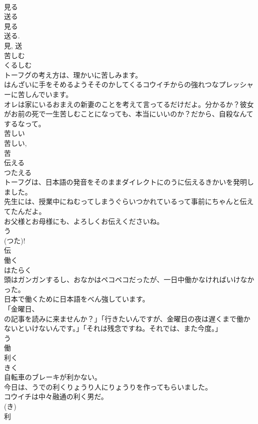 \documentclass[8pt]{extreport}
\begin{document}
\begin{CJK}{UTF8}{min}
\\	見る 
\\	送る 
\\	見る 
\\	送る. 
\\	見, 送	
\\	苦しむ	
\\	くるしむ	
\\	トーフグの考え方は、理かいに苦しみます。	
\\	はんざいに手をそめるようそそのかしてくるコウイチからの強れつなプレッシャーに苦しんでいます。	
\\	オレは家にいるおまえの新妻のことを考えて言ってるだけだよ。分かるか？彼女がお前の死で一生苦しむことになっても、本当にいいのか？だから、自殺なんてするなって。	
\\	苦しい 
\\	苦しい, 
\\	苦	
\\	伝える	
\\	つたえる	
\\	トーフグは、日本語の発音をそのままダイレクトにのうに伝えるきかいを発明しました。	
\\	先生には、授業中にねむってしまうぐらいつかれているって事前にちゃんと伝えてたんだよ。	
\\	お父様とお母様にも、よろしくお伝えくださいね。	
\\	う 
\\	(つた)! 
\\	伝	
\\	働く	
\\	はたらく	
\\	頭はガンガンするし、おなかはペコペコだったが、一日中働かなければいけなかった。	
\\	日本で働くために日本語をべん強しています。	
\\	「金曜日、
\\	の記事を読みに来ませんか？」「行きたいんですが、金曜日の夜は遅くまで働かないといけないんです。」「それは残念ですね。それでは、また今度。」	
\\	う 
\\	働	
\\	利く	
\\	きく	
\\	自転車のブレーキが利かない。	
\\	今日は、うでの利くりょうり人にりょうりを作ってもらいました。	
\\	コウイチは中々融通の利く男だ。	
\\	(き) 
\\	利	

\end{CJK}
\end{document}
